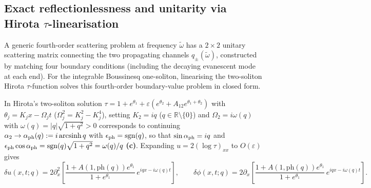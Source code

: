 \documentclass[11pt,a4paper]{article}
\newcommand{\Lc}{\textsf{\textbf{(c)}}}
\theoremstyle{remark}
\begin{document}
\subsection{Exact reflectionlessness and unitarity via Hirota $\tau$-linearisation}

A generic fourth-order scattering problem at frequency $\tilde\omega$ has a $2\times 2$ unitary scattering matrix connecting the two propagating channels $q_\pm(\tilde\omega)$, constructed by matching four boundary conditions (including the decaying evanescent mode at each end). For the integrable Boussinesq one-soliton, linearising the two-soliton Hirota $\tau$-function solves this fourth-order boundary-value problem in closed form.

In Hirota's two-soliton solution $\tau=1+e^{\theta_1}+\varepsilon(e^{\theta_2}+A_{12}e^{\theta_1+\theta_2})$ with $\theta_j=K_j x-\Omega_j t$ ($\Omega_j^2=K_j^2-K_j^4$), setting $K_2=iq$ ($q\in\mathbb{R}\setminus\{0\}$) and $\Omega_2=i\omega(q)$ with $\omega(q)=|q|\sqrt{1+q^2}>0$ corresponds to continuing $\alpha_2\to\alpha_{\rm ph}(q):=i\operatorname{arcsinh}q$ with $\epsilon_{\rm ph}=\operatorname{sgn}(q)$, so that $\sin\alpha_{\rm ph}=iq$ and $\epsilon_{\rm ph}\cos\alpha_{\rm ph}=\operatorname{sgn}(q)\sqrt{1+q^2}=\omega(q)/q$ \Lc. Expanding $u=2(\log\tau)_{xx}$ to $O(\varepsilon)$ gives
\begin{equation}\label{eq:du_hirota}
\delta u(x,t;q)=2\partial_x^2\left[\frac{1+A(1,\mathrm{ph}(q))e^{\theta_1}}{1+e^{\theta_1}}\,e^{iqx-i\omega(q)t}\right],
\qquad \delta\phi(x,t;q)=2\partial_x\left[\frac{1+A(1,\mathrm{ph}(q))e^{\theta_1}}{1+e^{\theta_1}}\,e^{iqx-i\omega(q)t}\right].
\end{equation}
\end{document}
